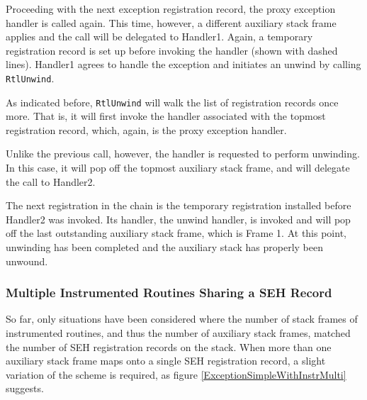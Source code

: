 Proceeding with the next exception registration record, the proxy exception handler
is called again. This time, however, a different auxiliary stack frame applies and
the call will be delegated to Handler1. Again, a temporary registration record is set 
up before invoking the handler (shown with dashed lines). Handler1 agrees to handle 
the exception and initiates an unwind by calling \verb|RtlUnwind|.

As indicated before, \verb|RtlUnwind| will walk the list of registration
records once more. That is, it will first invoke the handler associated with
the topmost registration record, which, again, is the proxy exception handler.

Unlike the previous call, however, the handler is requested to perform unwinding.
In this case, it will pop off the topmost auxiliary stack frame, and will
delegate the call to Handler2.

The next registration in the chain is the temporary registration installed before
Handler2 was invoked. Its handler, the unwind handler, is invoked and will pop
off the last outstanding auxiliary stack frame, which is Frame 1. At this point, unwinding
has been completed and the auxiliary stack has properly been unwound.

\subsubsection{Multiple Instrumented Routines Sharing a SEH Record}
So far, only situations have been considered where the number of stack frames
of instrumented routines, and thus the number of auxiliary stack frames, matched 
the number of SEH registration records on the stack. When more than one 
auxiliary stack frame maps onto a single SEH registration record, a slight variation
of the scheme is required, as figure \ref{ExceptionSimpleWithInstrMulti} suggests.


